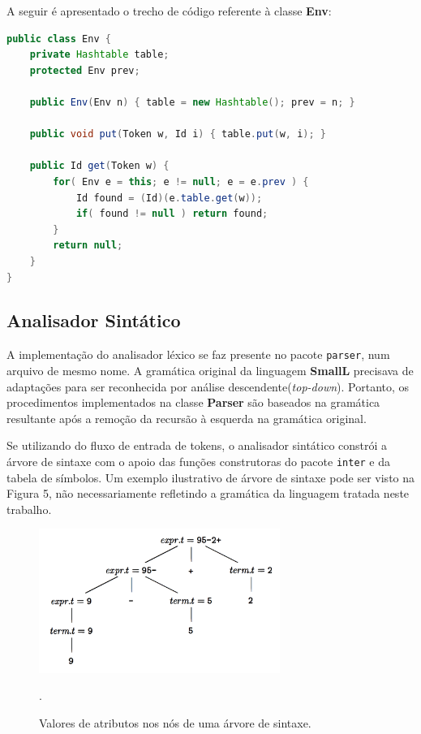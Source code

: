 A seguir é apresentado o trecho de código referente à classe \textbf{Env}:

\begin{lstlisting}[language=Java, caption=Classe Env.java]
public class Env {
    private Hashtable table;
    protected Env prev;

    public Env(Env n) { table = new Hashtable(); prev = n; }

    public void put(Token w, Id i) { table.put(w, i); }

    public Id get(Token w) {
        for( Env e = this; e != null; e = e.prev ) {
            Id found = (Id)(e.table.get(w));
            if( found != null ) return found;
        }
        return null;
    }
}
\end{lstlisting}

\subsection{Analisador Sintático}

A implementação do analisador léxico se faz presente no pacote \texttt{parser}, num arquivo de mesmo nome. A gramática original da linguagem \textbf{SmallL} precisava de adaptações para ser reconhecida por análise descendente(\textit{top-down}). Portanto, os procedimentos implementados na classe \textbf{Parser} são baseados na gramática resultante após a remoção da recursão à esquerda na gramática original.

Se utilizando do fluxo de entrada de tokens, o analisador sintático constrói a árvore de sintaxe com o apoio das funções construtoras do pacote \texttt{inter} e da tabela de símbolos. Um exemplo ilustrativo de árvore de sintaxe pode ser visto na Figura 5, não necessariamente refletindo a gramática da linguagem tratada neste trabalho.

\begin{figure}[H]
	\centering
	\includegraphics[width=0.7\textwidth]{imgs/syntax_tree.png}
	\caption{Valores de atributos nos nós de uma árvore de sintaxe.}.
	\label{fig:syntax_tree}
\end{figure}

